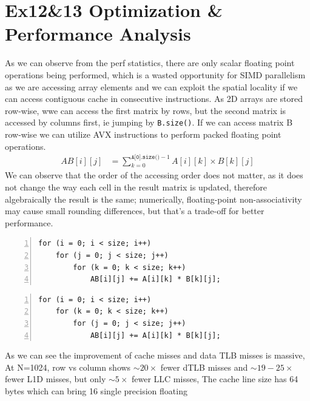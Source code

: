 \documentclass[9pt]{extarticle}
\begin{document}
\section*{Ex12\&13 Optimization \& Performance Analysis}
As we can observe from the perf statistics, there are only scalar floating point operations being performed, 
which is a wasted opportunity for SIMD parallelism as we are accessing array elements and we can exploit the spatial locality 
if we can access contiguous cache in consecutive instructions. As 2D arrays are stored row-wise, wwe can access the first matrix by rows, 
but the second matrix is accessed by columns first, ie jumping by \texttt{B.size()}. If we can access matrix B row-wise we can utilize AVX
instructions to perform packed floating point operations. 
\begin{align*}
    AB[i][j] &= \sum_{k=0}^{\texttt{A[0].size()}-1} A[i][k] \times B[k][j]
\end{align*}
We can observe that the order of the accessing order does not matter, as it does not change the way each cell in the result matrix is updated, 
therefore algebraically the result is the same; numerically, floating-point non-associativity may cause small rounding differences, but that's 
a trade-off for better performance.
\par\vspace{3ex}
\begin{minipage}{0.4\linewidth}
\begin{Verbatim}[frame=topline,numbers=left,label= Original,framesep=3mm]
for (i = 0; i < size; i++)
    for (j = 0; j < size; j++)
        for (k = 0; k < size; k++)
            AB[i][j] += A[i][k] * B[k][j];
\end{Verbatim}
\end{minipage}\hfill
\begin{minipage}{0.4\linewidth}
\begin{Verbatim}[frame=topline,numbers=left,label= Optimized,framesep=3mm]
for (i = 0; i < size; i++)
    for (k = 0; k < size; k++)
        for (j = 0; j < size; j++)
            AB[i][j] += A[i][k] * B[k][j];
\end{Verbatim}
\end{minipage}\hfill
\par\vspace{1ex}
As we can see the improvement of cache misses and data TLB misses is massive, At 
N=1024, row vs column shows $\sim 20 \times$ fewer dTLB misses and $\sim 19-25\times$ fewer L1D misses, 
but only $\sim 5 \times$ fewer LLC misses, The cache line size has 64 bytes which can bring 16 single precision floating
\end{document}
